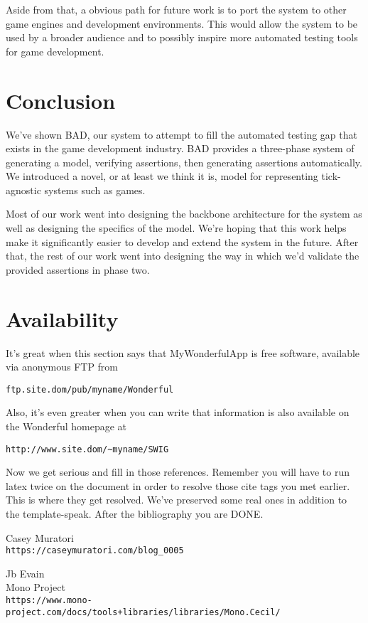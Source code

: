 \documentclass[letterpaper,twocolumn,10pt]{article}
\begin{document}
Aside from that, a obvious path for future work is to port the system to other game engines and development environments. This would allow the system to be used by a broader audience and to possibly inspire more automated testing tools for game development.

\section{Conclusion}

We've shown BAD, our system to attempt to fill the automated testing gap that exists in the game development industry. BAD provides a three-phase system of generating a model, verifying assertions, then generating assertions automatically. We introduced a novel, or at least we think it is, model for representing tick-agnostic systems such as games.

Most of our work went into designing the backbone architecture for the system as well as designing the specifics of the model. We're hoping that this work helps make it significantly easier to develop and extend the system in the future. After that, the rest of our work went into designing the way in which we'd validate the provided assertions in phase two.

\section{Availability}

It's great when this section says that MyWonderfulApp is free software, 
available via anonymous FTP from

\begin{center}
{\tt ftp.site.dom/pub/myname/Wonderful}\\
\end{center}

Also, it's even greater when you can write that information is also 
available on the Wonderful homepage at 

\begin{center}
{\tt http://www.site.dom/\~{}myname/SWIG}
\end{center}

Now we get serious and fill in those references.  Remember you will
have to run latex twice on the document in order to resolve those
cite tags you met earlier.  This is where they get resolved.
We've preserved some real ones in addition to the template-speak.
After the bibliography you are DONE.

\begin{thebibliography}{9}
    Casey Muratori\\
    \texttt{https://caseymuratori.com/blog\_0005}

    Jb Evain\\
    Mono Project\\
    \texttt{https://www.mono-project.com/docs/tools+libraries/libraries/Mono.Cecil/}
\end{thebibliography}






\theendnotes
\end{document}
